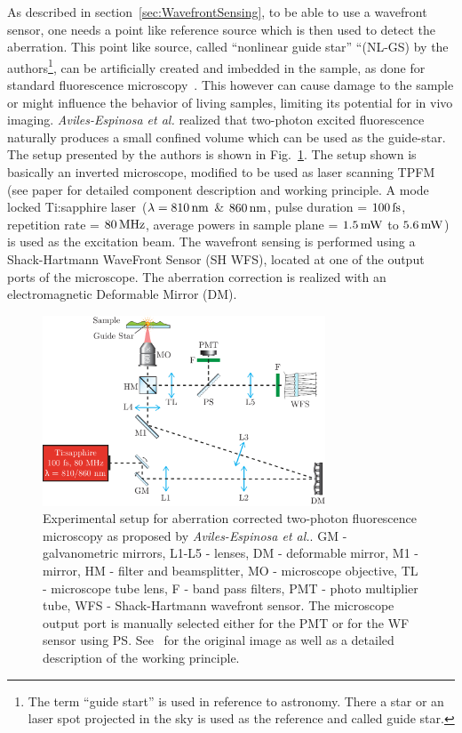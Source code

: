 As described in section~\ref{sec:WavefrontSensing}, to be able to use a wavefront sensor, one needs a point like reference source which is then used to detect the aberration. This point like source, called ``nonlinear guide star'' ``(NL-GS) by the authors\footnote{The term ``guide start'' is used in reference to astronomy. There a star or an laser spot projected in the sky is used as the reference and called guide star.}, can be artificially created and imbedded in the sample, as done for standard fluorescence microscopy~\cite{wide_fluorescence_guide_star}. This however can cause damage to the sample or might influence the behavior of living samples, limiting its potential for in vivo imaging. \emph{Aviles-Espinosa et al.} realized that two-photon excited fluorescence naturally produces a small confined volume which can be used as the guide-star. The setup presented by the authors is shown in Fig.~\ref{fig:TPFM_guide-star}. The setup shown is basically an inverted microscope, modified to be used as laser scanning TPFM (see paper for detailed component description and working principle. A mode locked Ti:sapphire laser~($\lambda = \unit[810]{nm}$ \& $\unit[860]{nm}$, pulse duration = $\unit[100]{fs}$, repetition rate = $\unit[80]{MHz}$, average powers in sample plane = $\unit[1.5]{mW}$ to $\unit[5.6]{mW}$) is used as the excitation beam. The wavefront sensing is performed using a Shack-Hartmann WaveFront Sensor (SH WFS), located at one of the output ports of the microscope. The aberration correction is realized with an electromagnetic Deformable Mirror (DM). 

\begin{figure}
	\centering
		\includegraphics[width=0.75\textwidth]{images/TPFM_guide-star}
	\caption{Experimental setup for aberration corrected two-photon fluorescence microscopy as proposed by \emph{Aviles-Espinosa et al.}. GM - galvanometric mirrors, L1-L5 - lenses, DM - deformable mirror, M1 - mirror, HM - filter and beamsplitter, MO - microscope objective, TL - microscope tube lens, F - band pass filters, PMT - photo multiplier tube, WFS - Shack-Hartmann wavefront sensor. The microscope output port is manually selected either for the PMT or for the WF sensor using PS. See~\cite{scan_TPFM_guide_start} for the original image as well as a detailed description of the working principle.}
	\label{fig:TPFM_guide-star}
\end{figure}


